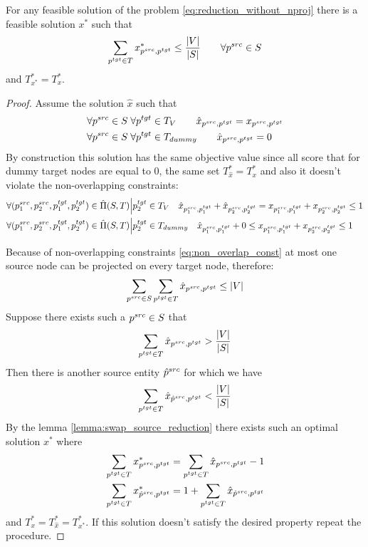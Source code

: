 \begin{corollary}
    For any feasible solution of the problem \eqref{eq:reduction_without_nproj} there is a feasible solution  \( x^* \)
    such that
    \[
        \sum\limits_{p^{tgt} \in T} x^*_{p^{src}, p^{tgt}} \leq \frac{|V|}{|S|}
        \qquad \forall p^{src} \in S
    \]
    and \( T_{x^*}^* =  T^*_x \).
\end{corollary}
\begin{proof}
    Assume the solution \( \hat{x} \) such that
    \begin{align*}
         & \forall p^{src} \in S \; \forall p^{tgt} \in T_V \qquad \hat{x}_{p^{src}, p^{tgt}} = x_{p^{src}, p^{tgt}} \\
         & \forall p^{src} \in S \; \forall p^{tgt} \in T_{dummy} \qquad \hat{x}_{p^{src}, p^{tgt}} = 0
    \end{align*}
    By construction this solution has the same objective value since all score that for dummy target nodes are equal to \( 0 \),
    the same set \( T^*_{\hat{x}} = T^*_x \)
    and also it doesn't violate the non-overlapping constraints:
    \begin{align*}
         & \forall (p_1^{src}, p_2^{src}, p_1^{tgt}, p_2^{tgt}) \in \hat{\Pi}(S, T) \Big| p_2^{tgt} \in T_{V} \quad
        \hat{x}_{p_1^{src}, p_1^{tgt}} + \hat{x}_{p_2^{src}, p_2^{tgt}} =
        x_{p_1^{src}, p_1^{tgt}} + x_{p_2^{src}, p_2^{tgt}} \leq 1                                                      \\
         & \forall (p_1^{src}, p_2^{src}, p_1^{tgt}, p_2^{tgt}) \in \hat{\Pi}(S, T) \Big| p_2^{tgt} \in T_{dummy} \quad
        \hat{x}_{p_1^{src}, p_1^{tgt}} + 0 \leq
        x_{p_1^{src}, p_1^{tgt}} + x_{p_2^{src}, p_2^{tgt}} \leq 1
    \end{align*}

    Because of non-overlapping constraints \eqref{eq:non_overlap_const} at most one source node can
    be projected on every target node, therefore:
    \[
        \sum\limits_{p^{src} \in S} \sum\limits_{p^{tgt} \in T} \hat{x}_{p^{src}, p^{tgt}} \leq |V|
    \]
    Suppose there exists such a \( p^{src} \in S \) that
    \[
        \sum\limits_{p^{tgt} \in T} \hat{x}_{p^{src}, p^{tgt}} > \frac{|V|}{|S|}
    \]
    Then there is another source entity \( \hat{p}^{src} \) for which we have
    \[
        \sum\limits_{p^{tgt} \in T} \hat{x}_{\hat{p}^{src}, p^{tgt}} < \frac{|V|}{|S|}
    \]
    By the lemma \ref{lemma:swap_source_reduction} there exists such an optimal solution \( x^* \)
    where
    \begin{align*}
         & \sum\limits_{p^{tgt} \in T} x^*_{p^{src}, p^{tgt}} = \sum\limits_{p^{tgt} \in T} \hat{x}_{p^{src}, p^{tgt}} - 1             \\
         & \sum\limits_{p^{tgt} \in T} x^*_{\hat{p}^{src}, p^{tgt}} = 1 + \sum\limits_{p^{tgt} \in T} \hat{x}_{\hat{p}^{src}, p^{tgt}} \\
    \end{align*}
    and \( T^*_x = T^*_{\hat{x}} = T^*_{x^*}  \). If this solution doesn't satisfy the desired property repeat the procedure.
\end{proof}

